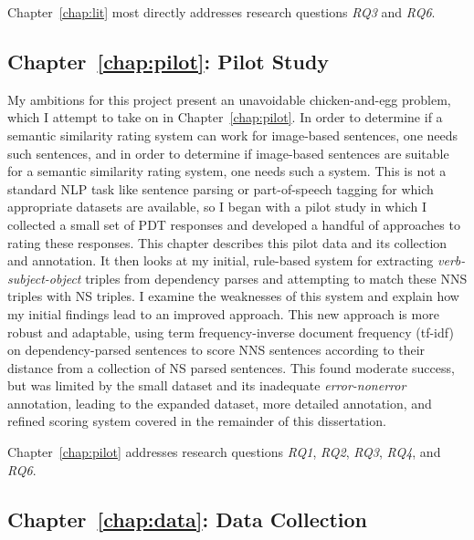 Chapter~\ref{chap:lit} most directly addresses research questions \textit{RQ3} and \textit{RQ6}.

\subsection{Chapter~\ref{chap:pilot}: Pilot Study}

My ambitions for this project present an unavoidable chicken-and-egg problem, which I attempt to take on in Chapter~\ref{chap:pilot}. In order to determine if a semantic similarity rating system can work for image-based sentences, one needs such sentences, and in order to determine if image-based sentences are suitable for a semantic similarity rating system, one needs such a system. This is not a standard NLP task like sentence parsing or part-of-speech tagging for which appropriate datasets are available, so I began with a pilot study in which I collected a small set of PDT responses and developed a handful of approaches to rating these responses. This chapter describes this pilot data and its collection and annotation. It then looks at my initial, rule-based system for extracting \textit{verb-subject-object} triples from dependency parses and attempting to match these NNS triples with NS triples. I examine the weaknesses of this system and explain how my initial findings lead to an improved approach. This new approach is more robust and adaptable, using term frequency-inverse document frequency (tf-idf) on dependency-parsed sentences to score NNS sentences according to their distance from a collection of NS parsed sentences. This found moderate success, but was limited by the small dataset and its inadequate \textit{error-nonerror} annotation, leading to the expanded dataset, more detailed annotation, and refined scoring system covered in the remainder of this dissertation. 

Chapter~\ref{chap:pilot} addresses research questions \textit{RQ1}, \textit{RQ2}, \textit{RQ3}, \textit{RQ4}, and \textit{RQ6}.


\subsection{Chapter~\ref{chap:data}: Data Collection}


